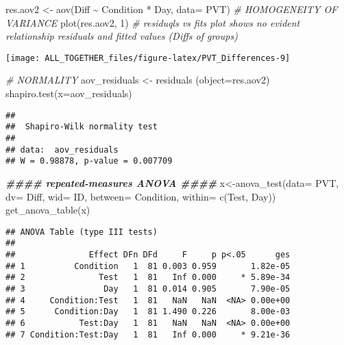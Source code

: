 \documentclass[
]{article}
\newenvironment{Shaded}{\begin{snugshade}}{\end{snugshade}}
\newcommand{\AttributeTok}[1]{\textcolor[rgb]{0.77,0.63,0.00}{#1}}
\newcommand{\CommentTok}[1]{\textcolor[rgb]{0.56,0.35,0.01}{\textit{#1}}}
\newcommand{\DecValTok}[1]{\textcolor[rgb]{0.00,0.00,0.81}{#1}}
\newcommand{\DocumentationTok}[1]{\textcolor[rgb]{0.56,0.35,0.01}{\textbf{\textit{#1}}}}
\newcommand{\FunctionTok}[1]{\textcolor[rgb]{0.00,0.00,0.00}{#1}}
\newcommand{\NormalTok}[1]{#1}
\newcommand{\OtherTok}[1]{\textcolor[rgb]{0.56,0.35,0.01}{#1}}
\newcommand{\SpecialCharTok}[1]{\textcolor[rgb]{0.00,0.00,0.00}{#1}}
\begin{document}
\begin{Shaded}
\begin{Highlighting}[]
\NormalTok{res.aov2 }\OtherTok{\textless{}{-}} \FunctionTok{aov}\NormalTok{(Diff }\SpecialCharTok{\textasciitilde{}}\NormalTok{ Condition }\SpecialCharTok{*}\NormalTok{ Day, }\AttributeTok{data=}\NormalTok{ PVT)}
\CommentTok{\# HOMOGENEITY OF VARIANCE}
\FunctionTok{plot}\NormalTok{(res.aov2, }\DecValTok{1}\NormalTok{) }\CommentTok{\# residuqls vs fits plot shows no evident relationship residuals and fitted values (Diffs of groups)}
\end{Highlighting}
\end{Shaded}

\texttt{[image: ALL\_TOGETHER\_files/figure-latex/PVT\_Differences-9]}

\begin{Shaded}
\begin{Highlighting}[]
\CommentTok{\# NORMALITY}
\NormalTok{aov\_residuals }\OtherTok{\textless{}{-}} \FunctionTok{residuals}\NormalTok{ (}\AttributeTok{object=}\NormalTok{res.aov2)}
\FunctionTok{shapiro.test}\NormalTok{(}\AttributeTok{x=}\NormalTok{aov\_residuals) }
\end{Highlighting}
\end{Shaded}

\begin{verbatim}
## 
##  Shapiro-Wilk normality test
## 
## data:  aov_residuals
## W = 0.98878, p-value = 0.007709
\end{verbatim}

\begin{Shaded}
\begin{Highlighting}[]
\DocumentationTok{\#\#\#\# repeated{-}measures ANOVA \#\#\#\#}
\NormalTok{x}\OtherTok{\textless{}{-}}\FunctionTok{anova\_test}\NormalTok{(}\AttributeTok{data=}\NormalTok{ PVT, }\AttributeTok{dv=}\NormalTok{ Diff, }\AttributeTok{wid=}\NormalTok{ ID, }\AttributeTok{between=}\NormalTok{ Condition, }\AttributeTok{within=} \FunctionTok{c}\NormalTok{(Test, Day))}
\FunctionTok{get\_anova\_table}\NormalTok{(x)}
\end{Highlighting}
\end{Shaded}

\begin{verbatim}
## ANOVA Table (type III tests)
## 
##               Effect DFn DFd     F     p p<.05      ges
## 1          Condition   1  81 0.003 0.959       1.82e-05
## 2               Test   1  81   Inf 0.000     * 5.89e-34
## 3                Day   1  81 0.014 0.905       7.90e-05
## 4     Condition:Test   1  81   NaN   NaN  <NA> 0.00e+00
## 5      Condition:Day   1  81 1.490 0.226       8.00e-03
## 6           Test:Day   1  81   NaN   NaN  <NA> 0.00e+00
## 7 Condition:Test:Day   1  81   Inf 0.000     * 9.21e-36
\end{verbatim}
\end{document}
